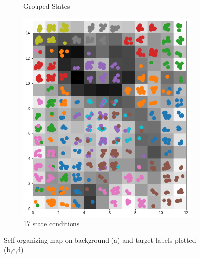 \documentclass[twocolumn]{article}
\begin{document}
\begin{figure}
\begin{subfigure}{0.45\textwidth}
            \caption{Grouped States}
            \label{fig:som4}
      \end{subfigure}
      \begin{subfigure}{0.45\textwidth}
            \centering
            \includegraphics[width=\textwidth]{som_17.png}
            \caption{17 state conditions}
            \label{fig:som17}
      \end{subfigure}

      \caption{Self organizing map on background (a) and target labels plotted (b,c,d)}
      \label{fig:som}
\end{figure}

%
\end{document}
